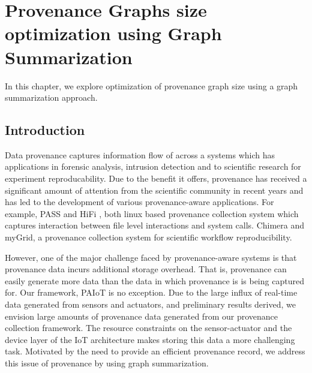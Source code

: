 
\chapter{Provenance Graphs size optimization using Graph Summarization} \label{MostNarrowEasy}

In this chapter, we explore optimization of provenance graph size using a graph summarization approach. 


\section{Introduction}

Data provenance captures information flow of across a systems which has applications in forensic analysis, intrusion detection and to scientific research for experiment reproducability. Due to the benefit it offers, provenance has received a significant amount of attention from the scientific community in recent years and has led to the development of various provenance-aware applications. For example, PASS \cite{muniswamy_reddy} and HiFi \cite{Bates2014LinuxPM}, both linux based provenance collection system which captures interaction between file level interactions and system calls. Chimera \cite{chimera} and myGrid,  a provenance collection system for scientific workflow reproducibility. 


However, one of the major challenge faced by provenance-aware systems is that provenance data incurs additional storage overhead. That is, provenance can easily generate more data than the data in which provenance is is being captured for. Our framework, PAIoT is no exception. Due to the large influx of real-time data generated from sensors and actuators, and preliminary results derived, we envision large amounts of provenance data generated from our provenance collection framework. The resource constraints on the sensor-actuator and the device layer of the IoT architecture makes storing this data a more challenging task. Motivated by the need to provide an efficient provenance record, we address this issue of provenance  by using graph summarization. 
 
